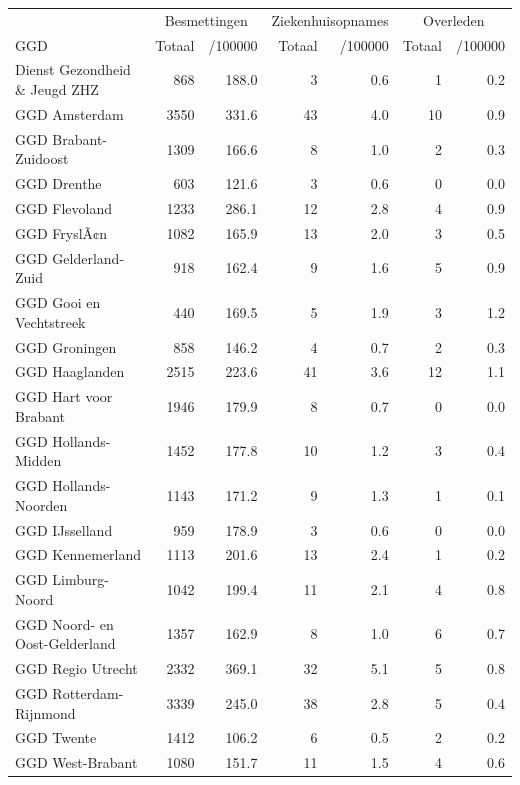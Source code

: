 \documentclass[
  english,
  man,floatsintext]{apa6}
\begin{document}
\begin{table}
\centering\begingroup\fontsize{10}{12}\selectfont

\begin{threeparttable}
\begin{tabular}{lrrrrrr}
\toprule
\multicolumn{1}{c}{ } & \multicolumn{2}{c}{Besmettingen} & \multicolumn{2}{c}{Ziekenhuisopnames} & \multicolumn{2}{c}{Overleden} \\
\cmidrule(l{3pt}r{3pt}){2-3} \cmidrule(l{3pt}r{3pt}){4-5} \cmidrule(l{3pt}r{3pt}){6-7}
GGD & Totaal & /100000 & Totaal & /100000 & Totaal & /100000\\
\midrule
Dienst Gezondheid \& Jeugd ZHZ & 868 & 188.0 & 3 & 0.6 & 1 & 0.2\\
GGD Amsterdam & 3550 & 331.6 & 43 & 4.0 & 10 & 0.9\\
GGD Brabant-Zuidoost & 1309 & 166.6 & 8 & 1.0 & 2 & 0.3\\
GGD Drenthe & 603 & 121.6 & 3 & 0.6 & 0 & 0.0\\
GGD Flevoland & 1233 & 286.1 & 12 & 2.8 & 4 & 0.9\\
GGD FryslÃ¢n & 1082 & 165.9 & 13 & 2.0 & 3 & 0.5\\
GGD Gelderland-Zuid & 918 & 162.4 & 9 & 1.6 & 5 & 0.9\\
GGD Gooi en Vechtstreek & 440 & 169.5 & 5 & 1.9 & 3 & 1.2\\
GGD Groningen & 858 & 146.2 & 4 & 0.7 & 2 & 0.3\\
GGD Haaglanden & 2515 & 223.6 & 41 & 3.6 & 12 & 1.1\\
GGD Hart voor Brabant & 1946 & 179.9 & 8 & 0.7 & 0 & 0.0\\
GGD Hollands-Midden & 1452 & 177.8 & 10 & 1.2 & 3 & 0.4\\
GGD Hollands-Noorden & 1143 & 171.2 & 9 & 1.3 & 1 & 0.1\\
GGD IJsselland & 959 & 178.9 & 3 & 0.6 & 0 & 0.0\\
GGD Kennemerland & 1113 & 201.6 & 13 & 2.4 & 1 & 0.2\\
GGD Limburg-Noord & 1042 & 199.4 & 11 & 2.1 & 4 & 0.8\\
GGD Noord- en Oost-Gelderland & 1357 & 162.9 & 8 & 1.0 & 6 & 0.7\\
GGD Regio Utrecht & 2332 & 369.1 & 32 & 5.1 & 5 & 0.8\\
GGD Rotterdam-Rijnmond & 3339 & 245.0 & 38 & 2.8 & 5 & 0.4\\
GGD Twente & 1412 & 106.2 & 6 & 0.5 & 2 & 0.2\\
GGD West-Brabant & 1080 & 151.7 & 11 & 1.5 & 4 & 0.6\\

\end{tabular}
\end{threeparttable}
\end{table}
\end{document}
